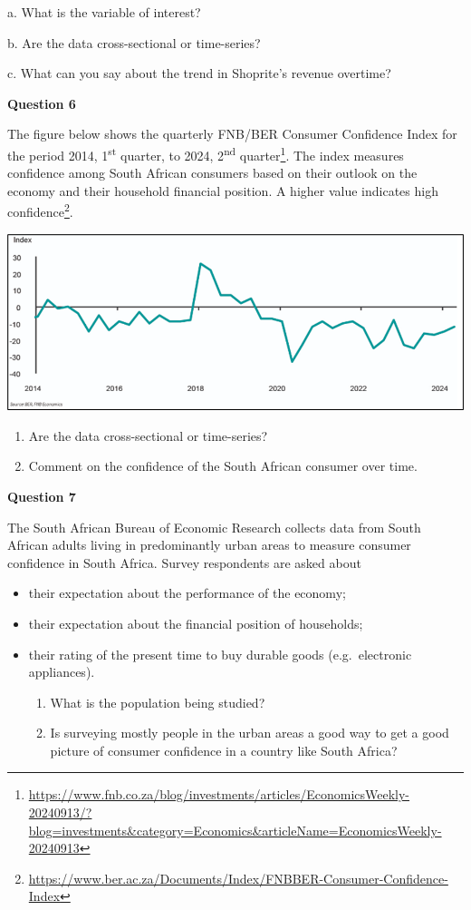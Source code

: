 \documentclass[
]{book}
\begin{document}
a. What is the variable of interest?

b. Are the data cross-sectional or time-series?

c. What can you say about the trend in Shoprite's revenue overtime?

\textbf{Question 6}

The figure below shows the quarterly FNB/BER Consumer Confidence Index for the period 2014, 1\textsuperscript{st} quarter, to 2024, 2\textsuperscript{nd} quarter\footnote{\url{https://www.fnb.co.za/blog/investments/articles/EconomicsWeekly-20240913/?blog=investments&category=Economics&articleName=EconomicsWeekly-20240913}}. The index measures confidence among South African consumers based on their outlook on the economy and their household financial position. A higher value indicates high confidence\footnote{\url{https://www.ber.ac.za/Documents/Index/FNBBER-Consumer-Confidence-Index}}.

\includegraphics[width=6.25in,height=\textheight]{images/clipboard-2186963206.png}

\begin{enumerate}
\def\labelenumi{\alph{enumi}.}
\item
  Are the data cross-sectional or time-series?
\item
  Comment on the confidence of the South African consumer over time.
\end{enumerate}

\hfill\break
\textbf{Question 7}

The South African Bureau of Economic Research collects data from South African adults living in predominantly urban areas to measure consumer confidence in South Africa. Survey respondents are asked about

\begin{itemize}
\item
  their expectation about the performance of the economy;
\item
  their expectation about the financial position of households;
\item
  their rating of the present time to buy durable goods (e.g.~electronic appliances).

  \begin{enumerate}
  \def\labelenumi{\alph{enumi}.}
  \item
    What is the population being studied?
  \item
    Is surveying mostly people in the urban areas a good way to get a good picture of consumer confidence in a country like South Africa?
  \end{enumerate}
\end{itemize}
\end{document}
